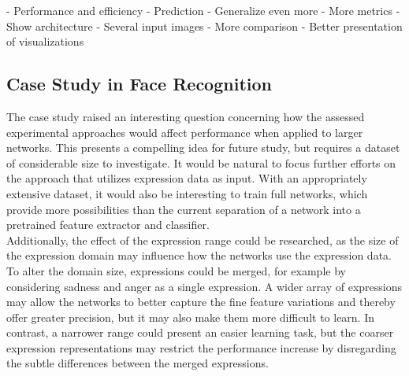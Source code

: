 - Performance and efficiency
- Prediction
- Generalize even more
- More metrics
- Show architecture
- Several input images
- More comparison
- Better presentation of visualizations

\subsection{Case Study in Face Recognition}

The case study raised an interesting question concerning how the assessed experimental approaches would affect performance when applied to larger networks. This presents a compelling idea for future study, but requires a dataset of considerable size to investigate. It would be natural to focus further efforts on the approach that utilizes expression data as input. With an appropriately extensive dataset, it would also be interesting to train full networks, which provide more possibilities than the current separation of a network into a pretrained feature extractor and classifier. \\

\noindent Additionally, the effect of the expression range could be researched, as the size of the expression domain may influence how the networks use the expression data. To alter the domain size, expressions could be merged, for example by considering sadness and anger as a single expression. A wider array of expressions may allow the networks to better capture the fine feature variations and thereby offer greater precision, but it may also make them more difficult to learn. In contrast, a narrower range could present an easier learning task, but the coarser expression representations may restrict the performance increase by disregarding the subtle differences between the merged expressions.


\cleardoublepage